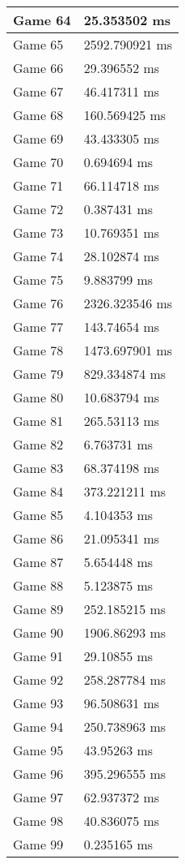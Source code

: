 \begin{multicols}{2}
\begin{tabular}{|l|l|}
	Game 64 & 25.353502 ms \\ \hline
	Game 65 & 2592.790921 ms \\ \hline
	Game 66 & 29.396552 ms \\ \hline
	Game 67 & 46.417311 ms \\ \hline
	Game 68 & 160.569425 ms \\ \hline
	Game 69 & 43.433305 ms \\ \hline
	Game 70 & 0.694694 ms \\ \hline
	Game 71 & 66.114718 ms \\ \hline
	Game 72 & 0.387431 ms \\ \hline
	Game 73 & 10.769351 ms \\ \hline
	Game 74 & 28.102874 ms \\ \hline
	Game 75 & 9.883799 ms \\ \hline
	Game 76 & 2326.323546 ms \\ \hline
	Game 77 & 143.74654 ms \\ \hline
	Game 78 & 1473.697901 ms \\ \hline
	Game 79 & 829.334874 ms \\ \hline
	Game 80 & 10.683794 ms \\ \hline
	Game 81 & 265.53113 ms \\ \hline
	Game 82 & 6.763731 ms \\ \hline
	Game 83 & 68.374198 ms \\ \hline
	Game 84 & 373.221211 ms \\ \hline
	Game 85 & 4.104353 ms \\ \hline
	Game 86 & 21.095341 ms \\ \hline
	Game 87 & 5.654448 ms \\ \hline
	Game 88 & 5.123875 ms \\ \hline
	Game 89 & 252.185215 ms \\ \hline
	Game 90 & 1906.86293 ms \\ \hline
	Game 91 & 29.10855 ms \\ \hline
	Game 92 & 258.287784 ms \\ \hline
	Game 93 & 96.508631 ms \\ \hline
	Game 94 & 250.738963 ms \\ \hline
	Game 95 & 43.95263 ms \\ \hline
	Game 96 & 395.296555 ms \\ \hline
	Game 97 & 62.937372 ms \\ \hline
	Game 98 & 40.836075 ms \\ \hline
	Game 99 & 0.235165 ms \\ \hline

\end{tabular}
\end{multicols}
